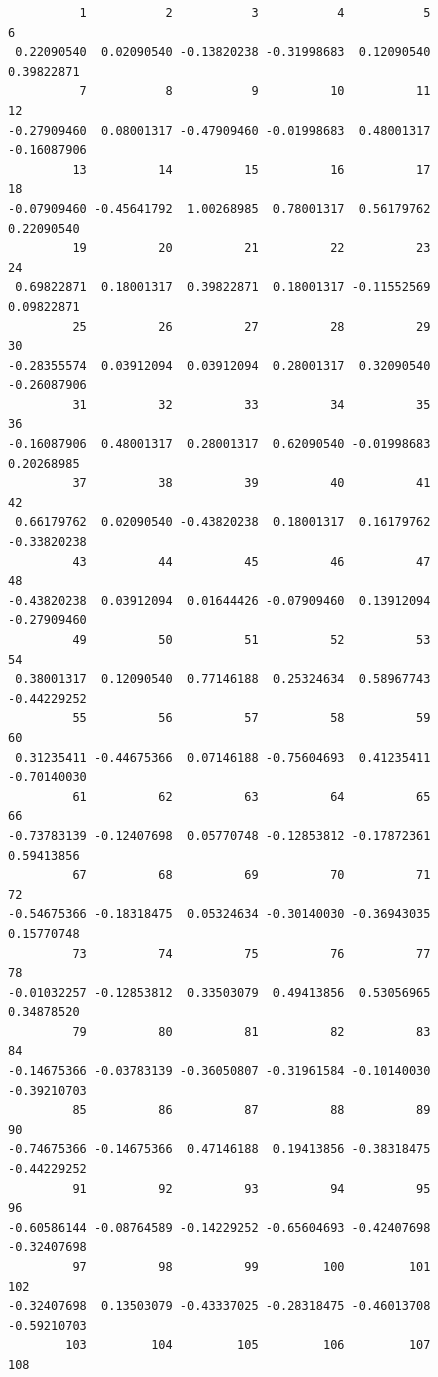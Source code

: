 \documentclass[
  letterpaper,
  DIV=11,
  numbers=noendperiod]{scrartcl}
\begin{document}
\begin{verbatim}
          1           2           3           4           5           6 
 0.22090540  0.02090540 -0.13820238 -0.31998683  0.12090540  0.39822871 
          7           8           9          10          11          12 
-0.27909460  0.08001317 -0.47909460 -0.01998683  0.48001317 -0.16087906 
         13          14          15          16          17          18 
-0.07909460 -0.45641792  1.00268985  0.78001317  0.56179762  0.22090540 
         19          20          21          22          23          24 
 0.69822871  0.18001317  0.39822871  0.18001317 -0.11552569  0.09822871 
         25          26          27          28          29          30 
-0.28355574  0.03912094  0.03912094  0.28001317  0.32090540 -0.26087906 
         31          32          33          34          35          36 
-0.16087906  0.48001317  0.28001317  0.62090540 -0.01998683  0.20268985 
         37          38          39          40          41          42 
 0.66179762  0.02090540 -0.43820238  0.18001317  0.16179762 -0.33820238 
         43          44          45          46          47          48 
-0.43820238  0.03912094  0.01644426 -0.07909460  0.13912094 -0.27909460 
         49          50          51          52          53          54 
 0.38001317  0.12090540  0.77146188  0.25324634  0.58967743 -0.44229252 
         55          56          57          58          59          60 
 0.31235411 -0.44675366  0.07146188 -0.75604693  0.41235411 -0.70140030 
         61          62          63          64          65          66 
-0.73783139 -0.12407698  0.05770748 -0.12853812 -0.17872361  0.59413856 
         67          68          69          70          71          72 
-0.54675366 -0.18318475  0.05324634 -0.30140030 -0.36943035  0.15770748 
         73          74          75          76          77          78 
-0.01032257 -0.12853812  0.33503079  0.49413856  0.53056965  0.34878520 
         79          80          81          82          83          84 
-0.14675366 -0.03783139 -0.36050807 -0.31961584 -0.10140030 -0.39210703 
         85          86          87          88          89          90 
-0.74675366 -0.14675366  0.47146188  0.19413856 -0.38318475 -0.44229252 
         91          92          93          94          95          96 
-0.60586144 -0.08764589 -0.14229252 -0.65604693 -0.42407698 -0.32407698 
         97          98          99         100         101         102 
-0.32407698  0.13503079 -0.43337025 -0.28318475 -0.46013708 -0.59210703 
        103         104         105         106         107         108 

\end{verbatim}
\end{document}

